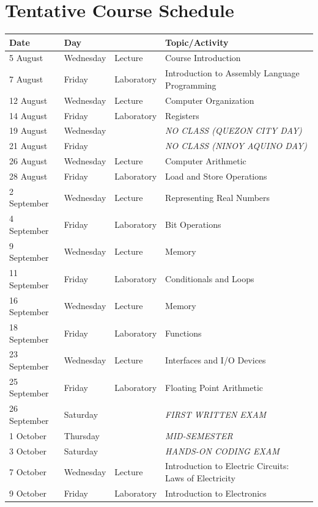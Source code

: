 \documentclass[9pt]{article}
\begin{document}
\section*{Tentative Course Schedule}
\begin{longtable}{|p{0.9in}|p{0.7in}|p{0.7in}|p{3in}|}
	\hline \textbf{Date} & \textbf{Day} & \textbf{} & \textbf{Topic/Activity}\\
	\hline 5 August	& Wednesday	& Lecture	 & Course Introduction\\
	\hline 7 August & Friday	& Laboratory	& Introduction to Assembly Language Programming\\
	\hline 12 August &	Wednesday &	Lecture	& Computer Organization\\
	\hline 14 August &	Friday	& Laboratory &	Registers\\
	\hline 19 August &	Wednesday &&	\textit{NO CLASS (QUEZON CITY DAY)}\\
	\hline 21 August &	Friday	&&\textit{NO CLASS (NINOY AQUINO DAY)}	\\
	\hline 26 August &	Wednesday &	Lecture &	Computer Arithmetic\\
	\hline 28 August &	Friday	& Laboratory	& Load and Store Operations\\
	\hline 2 September &	Wednesday	& Lecture &	Representing Real Numbers\\
	\hline 4 September &	Friday	& Laboratory	& Bit Operations\\
	\hline 9 September &	Wednesday	& Lecture &	Memory\\
	\hline 11 September &	Friday	& Laboratory	& Conditionals and Loops\\
	\hline 16 September	& Wednesday	& Lecture	& Memory\\
	\hline 18 September	& Friday	& Laboratory	& Functions\\
	\hline 23 September	& Wednesday	& Lecture	& Interfaces and I/O Devices\\
	\hline 25 September	& Friday	& Laboratory	& Floating Point Arithmetic\\
	\hline 26 September	& Saturday	&& \textit{FIRST WRITTEN EXAM}	\\
	\hline 1 October &	Thursday	&& \textit{MID-SEMESTER}	\\
	\hline 3 October &	Saturday	&& \textit{HANDS-ON CODING EXAM}	\\
	\hline 7 October &	Wednesday	& Lecture	& Introduction to Electric Circuits: Laws of Electricity\\
	\hline 9 October &	Friday	& Laboratory &	Introduction to Electronics\\

\end{longtable}
\end{document}
